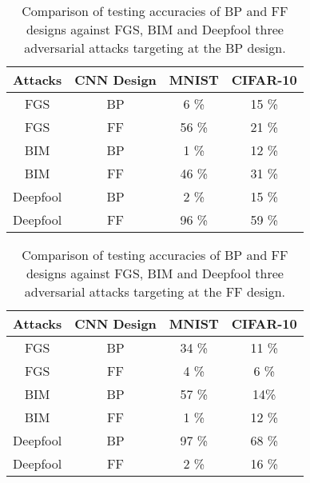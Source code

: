\documentclass[preprint,12pt]{elsarticle}
\begin{document}
\begin{table}[htb]
\begin{center}
\begin{tabular}{|c|c|c|c|} \hline
Attacks & CNN Design    &  MNIST     & CIFAR-10   \\ \hline
FGS     & BP            &  6 \%      &   15 \%    \\ \hline
FGS     & FF            &  56 \%     &   21 \%    \\ \hline \hline
BIM     & BP            &  1 \%      &   12 \%    \\ \hline
BIM     & FF            &  46 \%     &   31 \%    \\ \hline \hline
Deepfool& BP            &  2 \%      &   15 \%    \\ \hline
Deepfool& FF            &  96 \%     &   59 \%    \\ \hline 
\end{tabular}
\end{center}
\caption{Comparison of testing accuracies of BP and FF designs against
FGS, BIM and Deepfool three adversarial attacks targeting at the BP design.} 
\label{table:robustness}
\end{table}

\begin{table}[htb]
\begin{center}
\begin{tabular}{|c|c|c|c|} \hline
Attacks & CNN Design &  MNIST  & CIFAR-10   \\ \hline
FGS     & BP         &  34 \%  &   11 \%    \\ \hline
FGS     & FF         &  4 \%   &   6  \%    \\ \hline \hline
BIM     & BP         &  57 \%  &   14\%     \\ \hline
BIM     & FF         &  1 \%   &   12 \%    \\ \hline \hline
Deepfool& BP         &  97 \%  &   68 \%    \\ \hline
Deepfool& FF         &  2 \%   &   16 \%    \\ \hline 
\end{tabular}
\end{center}
\caption{Comparison of testing accuracies of BP and FF designs against
FGS, BIM and Deepfool three adversarial attacks targeting at the FF design.} 
\label{table:robustness-2}
\end{table}
\end{document}
